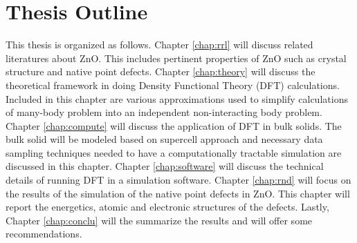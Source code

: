 \section{Thesis Outline}
This thesis is organized as follows. Chapter \ref{chap:rrl} will discuss related literatures about ZnO. This includes pertinent properties of ZnO such as crystal structure and native point defects. Chapter \ref{chap:theory} will discuss the theoretical framework in doing Density Functional Theory (DFT) calculations. Included in this chapter are various approximations used to simplify calculations of many-body problem into an independent non-interacting body problem. Chapter \ref{chap:compute} will discuss the application of DFT in bulk solids. The bulk solid will be modeled based on supercell approach and necessary data sampling techniques needed to have a computationally tractable simulation are discussed in this chapter. Chapter \ref{chap:software} will discuss the technical details of running DFT in a simulation software. Chapter \ref{chap:rnd} will focus on the results of the simulation of the native point defects in ZnO. This chapter will report the energetics, atomic and electronic structures of the defects. Lastly, Chapter \ref{chap:conclu} will the summarize the results and will offer some recommendations. 
